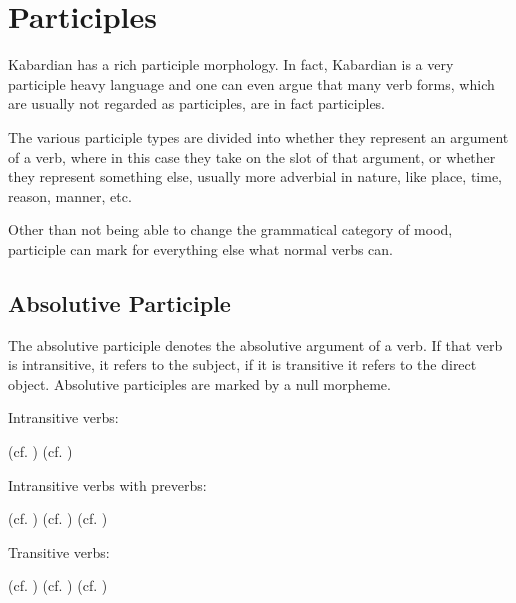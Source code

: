 \documentclass[a4paper, 10pt]{book}
\begin{document}
\section{Participles}
Kabardian has a rich participle morphology. In fact, Kabardian is a very participle heavy language and one can even argue that many verb forms, which are usually not regarded as participles, are in fact participles.

The various participle types are divided into whether they represent an argument of a verb, where in this case they take on the slot of that argument, or whether they represent something else, usually more adverbial in nature, like place, time, reason, manner, etc.

Other than not being able to change the grammatical category of mood, participle can mark for everything else what normal verbs can. 

\subsection{Absolutive Participle}
The absolutive participle denotes the absolutive argument of a verb. If that verb is intransitive, it refers to the subject, if it is transitive it refers to the direct object. Absolutive participles are marked by a null morpheme. 

Intransitive verbs:
\begin{exe}
\ex
\begin{xlist}
    \ex {} (cf. )
    \ex {} (cf. )
\end{xlist}
\end{exe}

Intransitive verbs with preverbs: 
\begin{exe}
\ex
\begin{xlist}
    \ex {} (cf. )  
    \ex {} (cf. )    
    \ex {} (cf. )
\end{xlist}
\end{exe}

Transitive verbs:
\begin{exe}
\ex
\begin{xlist}
    \ex {} (cf. )
    \ex {} (cf. )
    \ex {} (cf. )
\end{xlist}
\end{exe}
\end{document}
